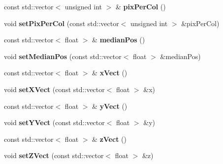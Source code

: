 \begin{DoxyCompactItemize}
\item 
const std\+::vector$<$ unsigned int $>$ \& {\bfseries pix\+Per\+Col} ()\hypertarget{classLaserData_a8dff7d0e8d0c2f78b2e19bb751e57c37}{}\label{classLaserData_a8dff7d0e8d0c2f78b2e19bb751e57c37}

\item 
void {\bfseries set\+Pix\+Per\+Col} (const std\+::vector$<$ unsigned int $>$ \&pix\+Per\+Col)\hypertarget{classLaserData_a15d7ac4f1a1913dce08017156db84a59}{}\label{classLaserData_a15d7ac4f1a1913dce08017156db84a59}

\item 
const std\+::vector$<$ float $>$ \& {\bfseries median\+Pos} ()\hypertarget{classLaserData_ae4ac8277666d486de8c80295258e5e5e}{}\label{classLaserData_ae4ac8277666d486de8c80295258e5e5e}

\item 
void {\bfseries set\+Median\+Pos} (const std\+::vector$<$ float $>$ \&median\+Pos)\hypertarget{classLaserData_aae63077922dac9585ee9f6aeffcd5185}{}\label{classLaserData_aae63077922dac9585ee9f6aeffcd5185}

\item 
const std\+::vector$<$ float $>$ \& {\bfseries x\+Vect} ()\hypertarget{classLaserData_a966b3d6c9473b1676445bffece1c8f2a}{}\label{classLaserData_a966b3d6c9473b1676445bffece1c8f2a}

\item 
void {\bfseries set\+X\+Vect} (const std\+::vector$<$ float $>$ \&x)\hypertarget{classLaserData_a545fd93b31e498d536764da4c7606f32}{}\label{classLaserData_a545fd93b31e498d536764da4c7606f32}

\item 
const std\+::vector$<$ float $>$ \& {\bfseries y\+Vect} ()\hypertarget{classLaserData_a962d48969a89e416f078a2282f700713}{}\label{classLaserData_a962d48969a89e416f078a2282f700713}

\item 
void {\bfseries set\+Y\+Vect} (const std\+::vector$<$ float $>$ \&y)\hypertarget{classLaserData_acb28cb7f17cbcab67274c8a628339e91}{}\label{classLaserData_acb28cb7f17cbcab67274c8a628339e91}

\item 
const std\+::vector$<$ float $>$ \& {\bfseries z\+Vect} ()\hypertarget{classLaserData_a7473f9bda3a43ea2f43bd6f1df5884b8}{}\label{classLaserData_a7473f9bda3a43ea2f43bd6f1df5884b8}

\item 
void {\bfseries set\+Z\+Vect} (const std\+::vector$<$ float $>$ \&z)\hypertarget{classLaserData_a13ad16cdb96c1b00b6f7c8bdf2d77e63}{}\label{classLaserData_a13ad16cdb96c1b00b6f7c8bdf2d77e63}


\end{DoxyCompactItemize}
